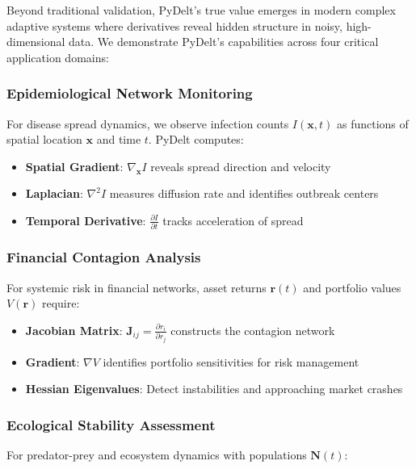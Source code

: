 \documentclass[10pt,journal,compsoc]{IEEEtran}
\begin{document}
Beyond traditional validation, PyDelt's true value emerges in modern complex adaptive systems where derivatives reveal hidden structure in noisy, high-dimensional data. We demonstrate PyDelt's capabilities across four critical application domains:

\subsubsection{Epidemiological Network Monitoring}

For disease spread dynamics, we observe infection counts $I(\mathbf{x}, t)$ as functions of spatial location $\mathbf{x}$ and time $t$. PyDelt computes:

\begin{itemize}
    \item \textbf{Spatial Gradient}: $\nabla_{\mathbf{x}} I$ reveals spread direction and velocity
    \item \textbf{Laplacian}: $\nabla^2 I$ measures diffusion rate and identifies outbreak centers
    \item \textbf{Temporal Derivative}: $\frac{\partial I}{\partial t}$ tracks acceleration of spread
\end{itemize}

\subsubsection{Financial Contagion Analysis}

For systemic risk in financial networks, asset returns $\mathbf{r}(t)$ and portfolio values $V(\mathbf{r})$ require:

\begin{itemize}
    \item \textbf{Jacobian Matrix}: $\mathbf{J}_{ij} = \frac{\partial r_i}{\partial r_j}$ constructs the contagion network
    \item \textbf{Gradient}: $\nabla V$ identifies portfolio sensitivities for risk management
    \item \textbf{Hessian Eigenvalues}: Detect instabilities and approaching market crashes
\end{itemize}

\subsubsection{Ecological Stability Assessment}

For predator-prey and ecosystem dynamics with populations $\mathbf{N}(t)$:
\end{document}
